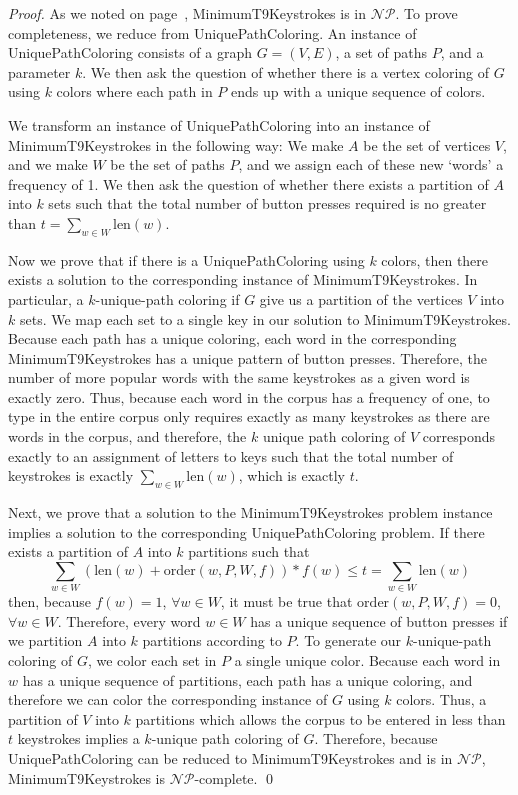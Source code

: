 \documentclass[runningheads]{llncs}
\newcommand{\NP}{\ensuremath{\mathcal{NP}}}
\begin{document}
\begin{proof}
As we noted on page~\pageref{minstrokesdecision}, {\sc MinimumT9Keystrokes} is
in \NP.  To prove completeness, we reduce from {\sc UniquePathColoring}.  An
instance of {\sc UniquePathColoring} consists of a graph $G=(V,E)$, a set of
paths $P$, and a parameter $k$.  We then ask the question of whether there is a
vertex coloring of $G$ using $k$ colors where each path in $P$ ends up with
a unique sequence of colors.

We transform an instance of {\sc UniquePathColoring} into an instance of {\sc
MinimumT9Keystrokes} in the following way:  We make $A$ be the set of vertices
$V$, and we make $W$ be the set of paths $P$, and we assign each of these new
`words' a frequency of 1.  We then ask the question of whether there exists a
partition of $A$ into $k$ sets such that the total number of button presses
required is no greater than $t=\sum_{w\in W} \mathrm{len}(w)$.

Now we prove that if there is a {\sc UniquePathColoring} using $k$ colors, then
there exists a solution to the corresponding instance of {\sc
MinimumT9Keystrokes}.  In particular, a $k$-unique-path coloring if $G$ give us
a partition of the vertices $V$ into $k$ sets.  We map each set to a single key
in our solution to {\sc MinimumT9Keystrokes}.  Because each path has a unique
coloring, each word in the corresponding {\sc MinimumT9Keystrokes} has a unique
pattern of button presses.  Therefore, the number of more popular words with
the same keystrokes as a given word is exactly zero.  Thus, because each word
in the corpus has a frequency of one, to type in the entire corpus only
requires exactly as many keystrokes as there are words in the corpus, and
therefore, the $k$ unique path coloring of $V$ corresponds exactly to an
assignment of letters to keys such that the total number of keystrokes is
exactly $\sum_{w\in W} \mathrm{len}(w)$, which is exactly $t$.

Next, we prove that a solution to the {\sc MinimumT9Keystrokes} problem
instance implies a solution to the corresponding {\sc UniquePathColoring}
problem.  If there exists a partition of $A$ into $k$ partitions such that
$$\sum_{w\in W} (\mathrm{len}(w)+\mathrm{order}(w,P,W,f))*f(w) \le t =
\sum_{w\in W} \mathrm{len}(w)$$ then, because $f(w) = 1$, $ \forall w \in W$,
it must be true that $\mathrm{order}(w,P,W,f) = 0$,  $\forall w \in W$.
Therefore, every word $w \in W$ has a unique sequence of button presses if we
partition $A$ into $k$ partitions according to $P$.  To generate our
$k$-unique-path coloring of $G$, we color each set in $P$ a single unique
color.  Because each word in $w$ has a unique sequence of partitions, each path
has a unique coloring, and therefore we can color the corresponding instance of
$G$ using $k$ colors.  Thus, a partition of $V$ into $k$ partitions which allows the corpus to be entered in less than $t$ keystrokes implies a $k$-unique path coloring of $G$.  Therefore, because {\sc UniquePathColoring} can be reduced to {\sc MinimumT9Keystrokes} and is in \NP, {\sc MinimumT9Keystrokes} is \NP-complete.
\qed
\end{proof}
\end{document}
